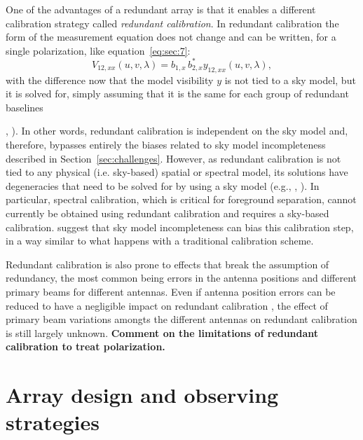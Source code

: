 One of the advantages of a redundant array is that it enables a different calibration strategy called {\it redundant calibration}. In redundant calibration the form of the measurement equation does not change and can be written, for a single polarization, like equation~\ref{eq:sec:7}:
\begin{equation}
V_{12,xx} (u,v,\lambda) = b_{1,x} \, b_{2,x}^* y_{12,xx} (u,v,\lambda),
\label{eq:sec:9}
\end{equation}
with the difference now that the model visibility $y$ is not tied to a sky model, but it is solved for, simply assuming that it is the same for each group of redundant baselines {\cite{wieringa92}, \cite{liu10}). In other words, redundant calibration is independent on the sky model and, therefore, bypasses entirely the biases related to sky model incompleteness described in Section~\ref{sec:challenges}. However, as redundant calibration is not tied to any physical (i.e. sky-based) spatial or spectral model, its solutions have degeneracies that need to be solved for by using a sky model (e.g., \cite{zheng14}, \cite{byrne19}). In particular, spectral calibration, which is critical for foreground separation, cannot currently be obtained using redundant calibration and requires a sky-based calibration. \cite{byrne19} suggest that sky model incompleteness can bias this calibration step, in a way similar to what happens with a traditional calibration scheme.

Redundant calibration is also prone to effects that break the assumption of redundancy, the most common being errors in the antenna positions and different primary beams for different antennas. Even if antenna position errors can be reduced to have a negligible impact on redundant calibration \cite{joseph18}, the effect of primary beam variations amongts the different antennas on redundant calibration is still largely unknown. {\bf Comment on the limitations of redundant calibration to treat polarization.}


\section{Array design and observing strategies}
\label{sec:design}

}
